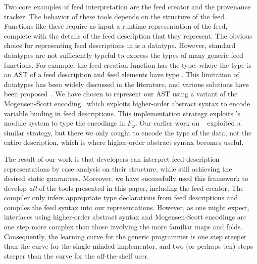 Two core examples of feed interpretation are the feed creator and the
provenance tracker. The behavior of these tools depends
on the structure of the feed.  Functions like these
require as input a runtime representation of the feed,
complete with the details of the feed description that
they represent. The obvious choice for representing feed descriptions
in \ocaml is a datatype. However, standard \ocaml datatypes are not
sufficiently typeful to express the types of many generic feed
functions. For example, the feed creation function has the type:
 
where the type  is an AST of a feed description and feed 
elements have type .
%
%
This limitation of datatypes has been widely discussed in the
literature, and various solutions have been 
proposed~\cite{padsml-padl,weirich:encodingtypecase,xi:popl03}. We have 
chosen to represent our AST using a variant of the Mogensen-Scott
encoding~\cite{mogensen:jfp,wand98} which exploits higher-order abstract syntax 
to encode variable binding in feed descriptions.  This implementation strategy 
exploits \ocaml's module system to type the encodings in $F_\omega$. 
Our earlier work on \padsml~\cite{padsml-padl} 
exploited a similar strategy,
but there we only sought to encode the \ocaml{} type of the data, not
the entire \padsml{} description, which is where higher-order abstract
syntax becomes useful.


The result of our work is that developers
can interpret feed-description representations by case analysis on
their structure, while still achieving the desired static
guarantees. Moreover, we have successfully used this framework to
develop {\it all} of the tools presented in this paper, including the
feed creator. The compiler only infers appropriate
type declarations from feed descriptions and compiles the feed syntax
into our representations.  However, as one might expect, interfaces using
higher-order abstract syntax and Mogensen-Scott encodings are one step more
complex than those involving the more familiar maps and folds.  Consequently, the
learning curve for the generic programmer is one step steeper than
the curve for the single-minded implementor, and two (or perhaps ten) steps steeper
than the curve for the off-the-shelf user.

